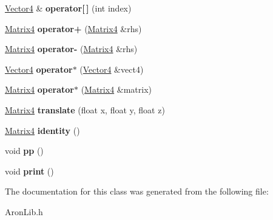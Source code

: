 \begin{DoxyCompactItemize}
\item 
\mbox{\label{class_space_matrix4_1_1_matrix4_a5177148ed3ae31f6c5642566c5db15c9}} 
\mbox{\hyperlink{class_space_vector4_1_1_vector4}{Vector4}} \& {\bfseries operator\mbox{[}$\,$\mbox{]}} (int index)
\item 
\mbox{\label{class_space_matrix4_1_1_matrix4_a8d1107457f530451bc6c871c29c09ecd}} 
\mbox{\hyperlink{class_space_matrix4_1_1_matrix4}{Matrix4}} {\bfseries operator+} (\mbox{\hyperlink{class_space_matrix4_1_1_matrix4}{Matrix4}} \&rhs)
\item 
\mbox{\label{class_space_matrix4_1_1_matrix4_aaf4abf8264697a38c7ece5a916f924f2}} 
\mbox{\hyperlink{class_space_matrix4_1_1_matrix4}{Matrix4}} {\bfseries operator-\/} (\mbox{\hyperlink{class_space_matrix4_1_1_matrix4}{Matrix4}} \&rhs)
\item 
\mbox{\label{class_space_matrix4_1_1_matrix4_a6818fd388797ac3b8df61dccc2efd255}} 
\mbox{\hyperlink{class_space_vector4_1_1_vector4}{Vector4}} {\bfseries operator$\ast$} (\mbox{\hyperlink{class_space_vector4_1_1_vector4}{Vector4}} \&vect4)
\item 
\mbox{\label{class_space_matrix4_1_1_matrix4_a6de63705c52bff6ade591a85ddf7cde0}} 
\mbox{\hyperlink{class_space_matrix4_1_1_matrix4}{Matrix4}} {\bfseries operator$\ast$} (\mbox{\hyperlink{class_space_matrix4_1_1_matrix4}{Matrix4}} \&matrix)
\item 
\mbox{\label{class_space_matrix4_1_1_matrix4_ad0f454fdc02a1f37aa658494f61a931d}} 
\mbox{\hyperlink{class_space_matrix4_1_1_matrix4}{Matrix4}} {\bfseries translate} (float x, float y, float z)
\item 
\mbox{\label{class_space_matrix4_1_1_matrix4_abb89178eaa1deef275886df0d19b50e6}} 
\mbox{\hyperlink{class_space_matrix4_1_1_matrix4}{Matrix4}} {\bfseries identity} ()
\item 
\mbox{\label{class_space_matrix4_1_1_matrix4_a225dbeed5391fdc5de3c4799308f838c}} 
void {\bfseries pp} ()
\item 
\mbox{\label{class_space_matrix4_1_1_matrix4_a6c8365b645a26a77a5fca5411b25097e}} 
void {\bfseries print} ()
\end{DoxyCompactItemize}


The documentation for this class was generated from the following file\+:\begin{DoxyCompactItemize}
\item 
Aron\+Lib.\+h\end{DoxyCompactItemize}
